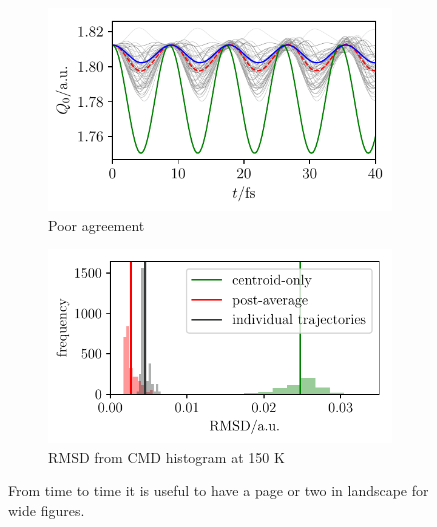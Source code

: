 \documentclass[11pt]{article}
\begin{document}
\begin{landscape}
\begin{figure} [htp!]
        \begin{subfigure}[b]{10cm}
            \centering
            \includegraphics [scale=1]{bad.pdf}
            \caption{Poor agreement}
        \end{subfigure}
        \begin{subfigure}[b]{10cm}
            \centering
            \includegraphics [scale=1]{rmsd.pdf}
            \caption{RMSD from CMD histogram at 150 K}
        \end{subfigure}
        \caption{
            From time to time it is useful to have a page or two in landscape for wide figures.
        }
    \end{figure}
\end{landscape}
\newpage
\end{document}
